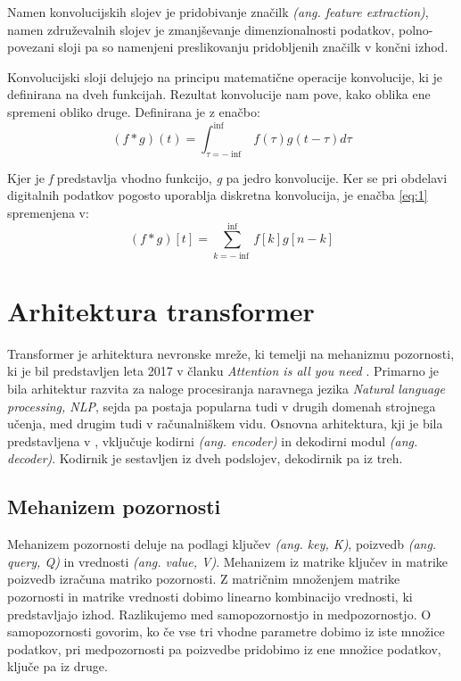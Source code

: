 \documentclass[a4paper,12pt,openright]{book}
\begin{document}
Namen konvolucijskih slojev je pridobivanje značilk \emph{(ang. feature extraction)}, namen združevalnih slojev je zmanjševanje dimenzionalnosti podatkov, polno-povezani sloji pa so namenjeni preslikovanju pridobljenih značilk v končni izhod.

Konvolucijski sloji delujejo na principu matematične operacije konvolucije, ki je definirana na dveh funkcijah. Rezultat konvolucije nam pove, kako oblika ene spremeni obliko druge. Definirana je z enačbo:
\begin{equation}
    (f*g)(t)=\int_{\tau=-\inf}^{\inf}f(\tau)g(t-\tau)d\tau
    \label{eq:1}
\end{equation}

Kjer je \emph{f} predstavlja vhodno funkcijo, \emph{g} pa jedro konvolucije. Ker se pri obdelavi digitalnih podatkov pogosto uporablja diskretna konvolucija, je enačba \ref{eq:1} spremenjena v:
\begin{equation}
    (f*g)[t]=\sum_{k=-\inf}^{\inf}f[k]g[n - k]
    \label{eq:2}
\end{equation}

\section{Arhitektura transformer}
Transformer je arhitektura nevronske mreže, ki temelji na mehanizmu pozornosti, ki je bil predstavljen leta 2017 v članku \emph{Attention is all you need} \cite{attention_is_all_you_need}. Primarno je bila arhitektur razvita za naloge procesiranja naravnega jezika \emph{Natural language processing, NLP}, sejda pa postaja popularna tudi v drugih domenah strojnega učenja, med drugim tudi v računalniškem vidu. Osnovna arhitektura, kji je bila predstavljena v \cite{attention_is_all_you_need}, vključuje kodirni \emph{(ang. encoder)} in dekodirni modul \emph{(ang. decoder)}. Kodirnik je sestavljen iz dveh podslojev, dekodirnik pa iz treh.

\subsection{Mehanizem pozornosti}
Mehanizem pozornosti deluje na podlagi ključev \emph{(ang. key, K)}, poizvedb \emph{(ang. query, Q)} in vrednosti \emph{(ang. value, V)}. Mehanizem iz matrike ključev in matrike poizvedb izračuna matriko pozornosti. Z matričnim množenjem matrike pozornosti in matrike vrednosti dobimo linearno kombinacijo vrednosti, ki predstavljajo izhod. Razlikujemo med samopozornostjo in medpozornostjo. O samopozornosti govorim, ko če vse tri vhodne parametre dobimo iz iste množice podatkov, pri medpozornosti pa poizvedbe pridobimo iz ene množice podatkov, ključe pa iz druge.
\end{document}
